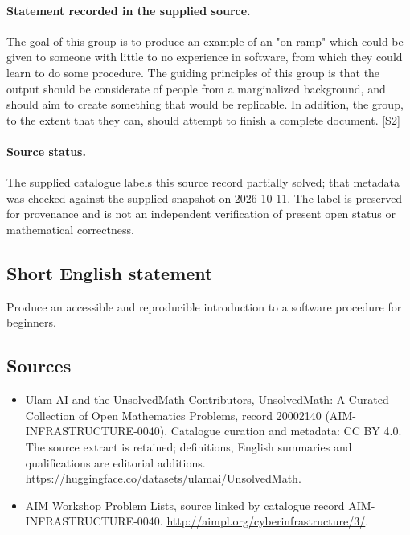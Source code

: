 \documentclass[11pt]{article}
\newcommand{\sref}[2]{\hyperlink{source:#1:#2}{[S#2]}}
\begin{document}
\paragraph{Statement recorded in the supplied source.}
The goal of this group is to produce an example of an "on-ramp" which could be given to someone with little to no experience in software, from which they could learn to do some procedure. The guiding principles of this group is that the output should be considerate of people from a marginalized background, and should aim to create something that would be replicable. In addition, the group, to the extent that they can, should attempt to finish a complete document. \sref{20002140}{2}
\paragraph{Source status.}
The supplied catalogue labels this source record partially solved; that metadata was checked against the supplied snapshot on 2026-10-11. The label is preserved for provenance and is not an independent verification of present open status or mathematical correctness.
\subsection{Short English statement}
Produce an accessible and reproducible introduction to a software procedure for beginners.
\subsection{Sources}
\begin{itemize}
\item[\hypertarget{source:20002140:1}{S1}] Ulam AI and the UnsolvedMath Contributors, UnsolvedMath: A Curated Collection of Open Mathematics Problems, record 20002140 (AIM-INFRASTRUCTURE-0040). Catalogue curation and metadata: CC BY 4.0. The source extract is retained; definitions, English summaries and qualifications are editorial additions.
\url{https://huggingface.co/datasets/ulamai/UnsolvedMath}.
\item[\hypertarget{source:20002140:2}{S2}] AIM Workshop Problem Lists, source linked by catalogue record AIM-INFRASTRUCTURE-0040.
\url{http://aimpl.org/cyberinfrastructure/3/}.
\end{itemize}
\end{document}
